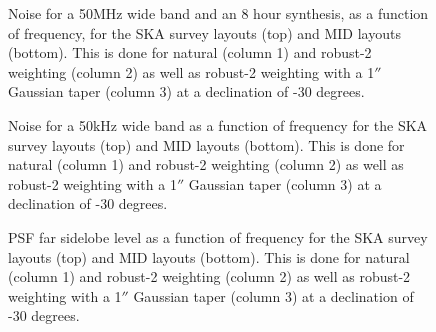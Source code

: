 \documentclass[sfheadings,a4paper,times,9pt,floats,floatfix]{article}
\begin{document}
\begin{figure}[H]
%  
 
%  
 \caption{Noise for a 50MHz wide band and an 8 hour synthesis, as a function of frequency,
for the SKA survey layouts (top) and MID layouts (bottom).
This is done for natural (column 1) and robust-2 weighting (column 2) as well as robust-2 weighting  with a 1$''$
Gaussian taper (column 3) at a declination of -30 degrees.}\label{fig:full-noise50}
\end{figure}

\begin{figure}[H]
%  
 
%  
 \caption{Noise for a 50kHz wide band as a function of frequency for the SKA survey layouts (top) and MID layouts
(bottom). This is done for natural (column 1) and robust-2 weighting (column 2) as well as robust-2 weighting  with a
1$''$ Gaussian taper (column 3) at a declination of -30 degrees.}\label{fig:full-noise50k}
\end{figure}

\begin{figure}[H]
%  
 
%  
 \caption{PSF far sidelobe level as a function of frequency for the SKA survey layouts (top) and MID layouts (bottom).
This is done for natural (column 1) and robust-2 weighting (column 2) as well as robust-2 weighting  with a 1$''$
Gaussian taper (column 3) at a declination of -30 degrees.}\label{fig:full-sdl}
\end{figure}
\end{document}
